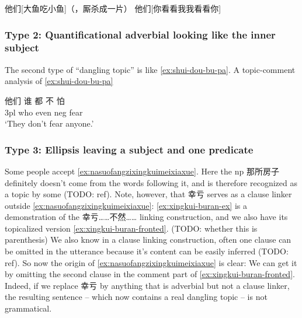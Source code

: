 \documentclass[UTF8, a4paper, oneside, scheme=plain, 12pt]{ctexrep}
\newcommand{\translate}[1]{`#1'}
\begin{document}
\begin{exe}
    \ex\label{ex:dayuchixiaoyu} 他们[大鱼吃小鱼]（，厮杀成一片）
    \ex\label{ex:nikankanwo} 他们[你看看我我看看你]
\end{exe}

\subsubsection{Type 2: Quantificational adverbial looking like the inner subject}

The second type of ``dangling topic'' is like \eqref{ex:shui-dou-bu-pa}.
A topic-comment analysis of \eqref{ex:shui-dou-bu-pa} 

\begin{exe}
    \ex\label{ex:shui-dou-bu-pa} \gll 他们 谁 都 不 怕 \\
    3pl who even \acs{neg} fear \\
    \glt \translate{They don't fear anyone.}
\end{exe}

\subsubsection{Type 3: Ellipsis leaving a subject and one predicate}

Some people accept \eqref{ex:nasuofangzixingkuimeixiaxue}.
Here the \acs{np} 那所房子 definitely doesn't come from the words following it,
and is therefore recognized as a topic by some (TODO: ref). 
Note, however, that 幸亏 serves as a clause linker outside \eqref{ex:nasuofangzixingkuimeixiaxue}:
\eqref{ex:xingkui-buran-ex} is a demonstration of the 幸亏……不然…… linking construction,
and we also have its topicalized version \eqref{ex:xingkui-buran-fronted}. (TODO: whether this is parenthesis)
We also know in a clause linking construction,
often one clause can be omitted in the utterance because it's content can be easily inferred (TODO: ref).
So now the origin of \eqref{ex:nasuofangzixingkuimeixiaxue} is clear:
We can get it by omitting the second clause in the comment part of \eqref{ex:xingkui-buran-fronted}.
Indeed, if we replace 幸亏 by anything that is adverbial but not a clause linker,
the resulting sentence -- which now contains a real dangling topic -- is not grammatical.
\end{document}
